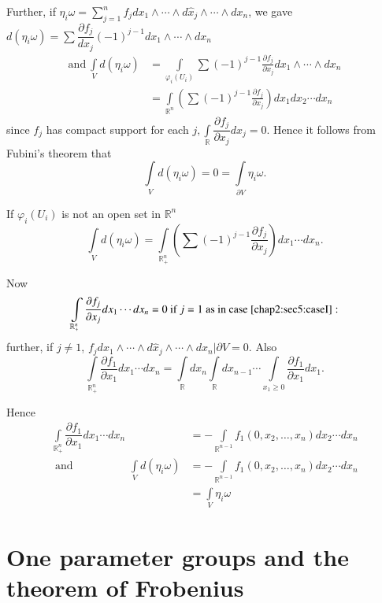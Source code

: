 Further, if $\eta_i \omega = \sum \limits^n_{j = 1} f_j dx_1 \wedge
\cdots \wedge d\hat{x}_j \wedge \cdots \wedge dx_n$, we gave
$d(\eta_i \omega) = \sum \dfrac{\partial f_j}{dx_j} (-1)^{j-1} dx_1
\wedge \cdots \wedge dx_n$  
\begin{align*}
  \text{and} ~  \int \limits_V d(\eta_i \omega) & = \int
  \limits_{\varphi_i (U_i)} \sum (-1)^{j-1} \frac{\partial
    f_j}{\partial x_j} dx_1 \wedge \cdots \wedge dx_n \\ 
  & = \int \limits_{\mathbb{R}^n} \left(\sum (-1)^{j-1} \frac{\partial
    f_j}{\partial x_j}\right) dx_1 dx_2 \cdots dx_n 
\end{align*}
since $f_j$ has compact support for each $j, \int \limits
_{\mathbb{R}}\dfrac{\partial f_j}{\partial x_j} dx_j = 0$. Hence it
follows from Fubini's theorem that  
$$
\int \limits_{V} d (\eta_i \omega) = 0 = \int \limits_{\partial V}
\eta_i \omega. 
$$

\begin{romancase}\label{chap2:sec5:caseII} %
  If $\varphi_i (U_i)$ is not an open set in $\mathbb{R}^n$
  $$
  \int \limits_{V} d(\eta_i \omega) = \int \limits_{\mathbb{R}^n_+ }
  \left(\sum (-1)^{j-1} \frac{\partial f_j}{\partial x_j}\right) dx_1 \cdots
  dx_n. 
  $$
\end{romancase}

Now
$$
\int \limits_{\mathbb{R}^n_+} \frac{\partial f_j}{\partial x_j} dx_1
\cdots dx_n = 0 \text{ if } j=1 \text{ as in case \ref{chap2:sec5:caseI}}: 
$$
further, if $j \neq 1$, $f_j dx_1 \wedge \cdots \wedge d\hat{x}_j
\wedge \cdots \wedge dx_n| \partial V = 0$. Also  
$$
  \int \limits_{\mathbb{R}^n_+} \dfrac{\partial f_1}{\partial x_1}
  dx_1 \cdots dx_n 
  = \int \limits_{\mathbb{R}} dx_n \int \limits_{\mathbb{R}} dx_{n-1}
  \cdots \int \limits_{x_1 \geq 0} \frac{\partial f_1}{\partial x_1}
  dx_1. 
$$

Hence\pageoriginale 
\begin{align*}
  \int \limits_{\mathbb{R}^n_+} \dfrac{\partial f_1}{\partial
  x_1} dx_1 \cdots dx_n
  & = - \int \limits_{\mathbb{R}^{n-1}} f_1 (0, x_2, \ldots , x_n)
  dx_2 \cdots dx_n\\ 
  \text{ and } \hspace{2cm} \int \limits_{V} d (\eta_i \omega) & = - \int
  \limits_{\mathbb{R}^{n-1}} f_1 (0, x_2, \ldots , x_n) dx_2 \cdots
  dx_n\\ 
  & = \int \limits_{V} \eta_i \omega
\end{align*}

\section{One parameter groups and the theorem of
  Frobenius}\label{chap2:sec6} 

